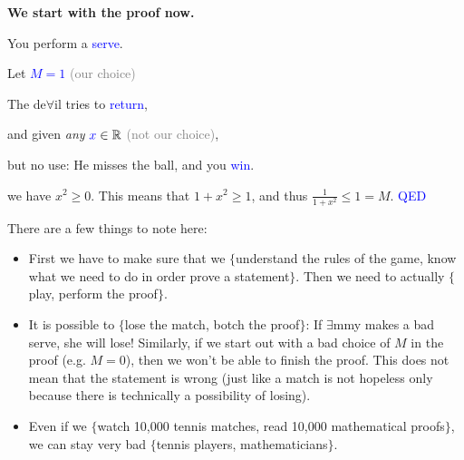 \documentclass[11pt]{article}
\theoremstyle{plain}
\theoremstyle{definition}
\theoremstyle{remark}
\numberwithin{equation}{section}
\newcommand{\e}{\exists}
\newcommand{\f}{\forall}
\newcommand{\R}{\mathbb{R}}
\begin{document}
\begin{paracol}{2}
    \begin{nthcolumn}{1}
    \textbf{We start with the proof now.}
    \end{nthcolumn}
\begin{nthcolumn*}{0}
  You perform a \textcolor{blue}{serve}.
\end{nthcolumn*}     
    \begin{nthcolumn}{1}
    Let \textcolor{blue}{$M = 1$} \textcolor{gray}{(our choice)}
    \end{nthcolumn}
\begin{nthcolumn*}{0}
The de$\f$il tries to \textcolor{blue}{return},
\end{nthcolumn*}     
    \begin{nthcolumn}{1}
    and given \textit{any} ${\color{blue}{x}}\in \R$ \textcolor{gray}{(not our choice)}, 
    \end{nthcolumn}
\begin{nthcolumn*}{0}
but no use: He misses the ball, and  you \textcolor{blue}{win}.
\end{nthcolumn*}     
    \begin{nthcolumn}{1}
    we have $x^2 \geq 0$. This means that $1+x^2\geq 1$, and thus $\frac{1}{1+x^2}\leq 1 = M$. \textcolor{blue}{QED}
    \end{nthcolumn}
\end{paracol}
\ifvoid\mybox\else\insert\footins{\unvbox\mybox}\fi
There are a few things to note here: 
\begin{itemize}
    \item First we have to make sure that we $\{$understand the rules of the game, know what we need to do in order prove a statement$\}$. Then we need to actually $\{$play, perform the proof$\}$. 
    \item It is possible to $\{$lose the match, botch the proof$\}$: If $\e$mmy makes a bad serve, she will lose! Similarly, if we start out with a bad choice of $M$ in the proof (e.g. $M=0$), then we won't be able to finish the proof. This does not mean that the statement is wrong (just like a match is not hopeless only because there is technically a possibility of losing).
    \item Even if we $\{$watch 10,000 tennis matches, read 10,000 mathematical proofs$\}$, we can stay very bad $\{$tennis players, mathematicians$\}$. 
\end{itemize} 
\end{document}

